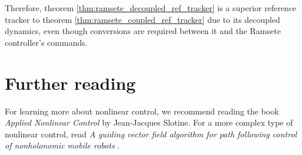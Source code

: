 Therefore, theorem \ref{thm:ramsete_decoupled_ref_tracker} is a superior
\gls{reference} tracker to theorem \ref{thm:ramsete_coupled_ref_tracker} due to
its decoupled dynamics, even though conversions are required between it and the
Ramsete \gls{controller}'s commands.

\section{Further reading}

For learning more about nonlinear control, we recommend reading the book
\textit{Applied Nonlinear Control} by Jean-Jacques Slotine. For a more complex
type of nonlinear control, read \textit{A guiding vector field algorithm for
path following control of nonholonomic mobile robots} \cite{bib:gvf}.
